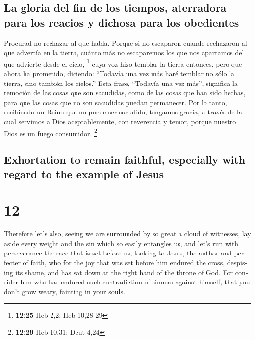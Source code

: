 \begin{paracol}{2}
\hypertarget{la-gloria-del-fin-de-los-tiempos-aterradora-para-los-reacios-y-dichosa-para-los-obedientes}{%
\subsection{La gloria del fin de los tiempos, aterradora para los
reacios y dichosa para los
obedientes}\label{la-gloria-del-fin-de-los-tiempos-aterradora-para-los-reacios-y-dichosa-para-los-obedientes}}

 Procurad no rechazar al que habla. Porque si no
escaparon cuando rechazaron al que advertía en la tierra, cuánto más no
escaparemos los que nos apartamos del que advierte desde el cielo,
\footnote{\textbf{12:25} Heb 2,2; Heb 10,28-29}  cuya voz
hizo temblar la tierra entonces, pero que ahora ha prometido, diciendo:
``Todavía una vez más haré temblar no sólo la tierra, sino también los
cielos.''  Esta frase, ``Todavía una vez más'', significa
la remoción de las cosas que son sacudidas, como de las cosas que han
sido hechas, para que las cosas que no son sacudidas puedan permanecer.
 Por lo tanto, recibiendo un Reino que no puede ser
sacudido, tengamos gracia, a través de la cual servimos a Dios
aceptablemente, con reverencia y temor,  porque nuestro
Dios es un fuego consumidor. \footnote{\textbf{12:29} Heb 10,31; Deut
  4,24}

\switchcolumn
\begin{otherlanguage}{english}

\hypertarget{exhortation-to-remain-faithful-especially-with-regard-to-the-example-of-jesus}{%
\subsection{Exhortation to remain faithful, especially with regard to
the example of
Jesus}\label{exhortation-to-remain-faithful-especially-with-regard-to-the-example-of-jesus}}

\hypertarget{section-23}{%
\section{12}\label{section-23}}

 Therefore let's also, seeing we are surrounded by so
great a cloud of witnesses, lay aside every weight and the sin which so
easily entangles us, and let's run with perseverance the race that is
set before us,  looking to Jesus, the author and perfecter
of faith, who for the joy that was set before him endured the cross,
despising its shame, and has sat down at the right hand of the throne of
God.  For consider him who has endured such contradiction
of sinners against himself, that you don't grow weary, fainting in your
souls.


\end{otherlanguage}
\end{paracol}
